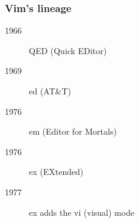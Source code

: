 \begin{frame}[fragile]
  \frametitle{Vim's lineage}
  \begin{description}
    \item[1966] QED (Quick EDitor)
    \item[1969] ed (AT\&T)
    \item[1976] em (Editor for Mortals)
    \item[1976] ex (EXtended)
    \item[1977] ex adds the vi (visual) mode
  \end{description}
\end{frame}
